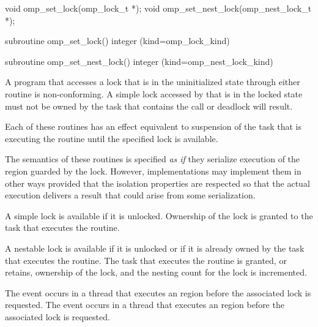 \format
\begin{ccppspecific}
\begin{ompcFunction}
void omp_set_lock(omp_lock_t *);
void omp_set_nest_lock(omp_nest_lock_t *);
\end{ompcFunction}
\end{ccppspecific}

\begin{fortranspecific}
\begin{ompfSubroutine}
subroutine omp_set_lock()
integer (kind=omp_lock_kind) 

subroutine omp_set_nest_lock()
integer (kind=omp_nest_lock_kind) 
\end{ompfSubroutine}
\end{fortranspecific}

\constraints
A program that accesses a lock that is in the uninitialized state 
through either routine is non-conforming. A simple lock accessed by 
 that is in the locked state must not be owned 
by the task that contains the call or deadlock will result.

\effect
Each of these routines has an effect equivalent to suspension of the task
that is executing the routine until the specified lock is available.

\begin{note} The semantics of these routines is specified \emph{as if} 
they serialize execution of the region guarded by the lock. However, 
implementations may implement them in other ways provided that the 
isolation properties are respected so that the actual execution 
delivers a result that could arise from some serialization.
\end{note}

A simple lock is available if it is unlocked. Ownership of the lock is
granted to the task that executes the routine.

A nestable lock is available if it is unlocked or if it is already owned by
the task that executes the routine. The task that executes the routine is granted,
or retains, ownership of the lock, and the nesting count for the lock is
incremented.

\events
The  event occurs in a thread that executes an 
 region before the associated lock is requested.
The  event occurs in a thread that executes
an  region before the associated lock is requested.

